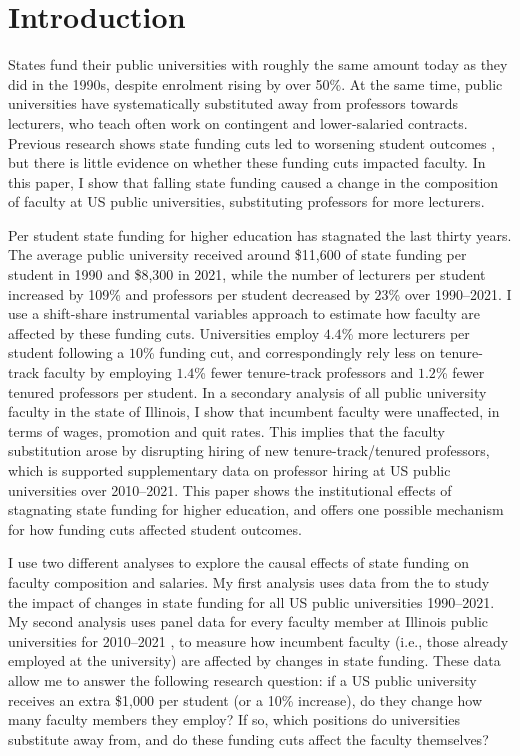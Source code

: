 \section{Introduction}
\label{sec:intro}
States fund their public universities with roughly the same amount today as they did in the 1990s, despite enrolment rising by over 50\%.
At the same time, public universities have systematically substituted away from professors towards lecturers, who teach often work on contingent and lower-salaried contracts.
Previous research shows state funding cuts led to worsening student outcomes \citep{NBERw23736,NBERw27885}, but there is little evidence on whether these funding cuts impacted faculty.
In this paper, I show that falling state funding caused a change in the composition of faculty at US public universities, substituting professors for more lecturers.

Per student state funding for higher education has stagnated the last thirty years.
The average public university received around \$11,600 of state funding per student in 1990 and \$8,300 in 2021, while the number of lecturers per student increased by 109\% and professors per student decreased by $23$\% over 1990--2021.
I use a shift-share instrumental variables approach to estimate how faculty are affected by these funding cuts.
Universities employ $4.4$\% more lecturers per student following a $10$\% funding cut, and correspondingly rely less on tenure-track faculty by employing $1.4$\% fewer tenure-track professors and $1.2$\% fewer tenured professors per student.
In a secondary analysis of all public university faculty in the state of Illinois, I show that incumbent faculty were unaffected, in terms of wages, promotion and quit rates.
This implies that the faculty substitution arose by disrupting hiring of new tenure-track/tenured professors, which is supported supplementary data on professor hiring at US public universities over 2010--2021.
This paper shows the institutional effects of stagnating state funding for higher education, and offers one possible mechanism for how funding cuts affected student outcomes.

I use two different analyses to explore the causal effects of state funding on faculty composition and salaries.
My first analysis uses data from the \citet[IPEDS]{ipeds} to study the impact of changes in state funding for all US public universities 1990--2021.
My second analysis uses panel data for every faculty member at Illinois public universities for 2010--2021 \citet[IBHED]{ibhed}, to measure how incumbent faculty (i.e., those already employed at the university) are affected by changes in state funding.
These data allow me to answer the following research question: if a US public university receives an extra \$1,000 per student (or a 10\% increase), do they change how many faculty members they employ?
If so, which positions do universities substitute away from, and do these funding cuts affect the faculty themselves?


